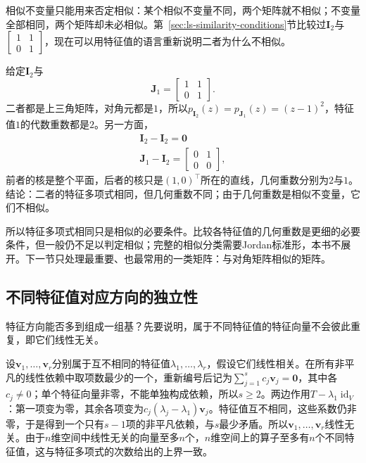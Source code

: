 相似不变量只能用来否定相似：某个相似不变量不同，两个矩阵就不相似；不变量全部相同，两个矩阵却未必相似。第~\ref{sec:ls-similarity-conditions}节比较过$\bm I_2$与$\left[\begin{smallmatrix}1&1\\0&1\end{smallmatrix}\right]$，现在可以用特征值的语言重新说明二者为什么不相似。
\begin{example}[反例：特征多项式相同而不相似]
\label{ex:ls-same-charpoly-not-similar}
给定$\bm I_2$与
\[
 \bm J_1=\begin{bmatrix}1&1\\0&1\end{bmatrix}.
\]
二者都是上三角矩阵，对角元都是$1$，所以$p_{\bm I_2}(z)=p_{\bm J_1}(z)=(z-1)^2$，特征值$1$的代数重数都是$2$。另一方面，
\[
\begin{gathered}
\bm I_2-\bm I_2=\bm0\\
\bm J_1-\bm I_2=\begin{bmatrix}0&1\\0&0\end{bmatrix},
\end{gathered}
\]
前者的核是整个平面，后者的核只是$(1,0)^{\top}$所在的直线，几何重数分别为$2$与$1$。结论：二者的特征多项式相同，但几何重数不同；由于几何重数是相似不变量，它们不相似。
\end{example}
所以特征多项式相同只是相似的必要条件。比较各特征值的几何重数是更细的必要条件，但一般仍不足以判定相似；完整的相似分类需要Jordan标准形，本书不展开。下一节只处理最重要、也最常用的一类矩阵：与对角矩阵相似的矩阵。

\subsection{不同特征值对应方向的独立性}
\label{sec:ls-eigenvector-independence}

特征方向能否多到组成一组基？先要说明，属于不同特征值的特征向量不会彼此重复，即它们线性无关。

设$\bm v_1,\ldots,\bm v_r$分别属于互不相同的特征值$\lambda_1,\ldots,\lambda_r$，假设它们线性相关。在所有非平凡的线性依赖中取项数最少的一个，重新编号后记为$\sum_{j=1}^s c_j\bm v_j=\bm0$，其中各$c_j\neq0$；单个特征向量非零，不能单独构成依赖，所以$s\geq2$。两边作用$T-\lambda_1\operatorname{id}_V$：第一项变为零，其余各项变为$c_j(\lambda_j-\lambda_1)\bm v_j$。特征值互不相同，这些系数仍非零，于是得到一个只有$s-1$项的非平凡依赖，与$s$最少矛盾。所以$\bm v_1,\ldots,\bm v_r$线性无关。由于$n$维空间中线性无关的向量至多$n$个，$n$维空间上的算子至多有$n$个不同特征值，这与特征多项式的次数给出的上界一致。

